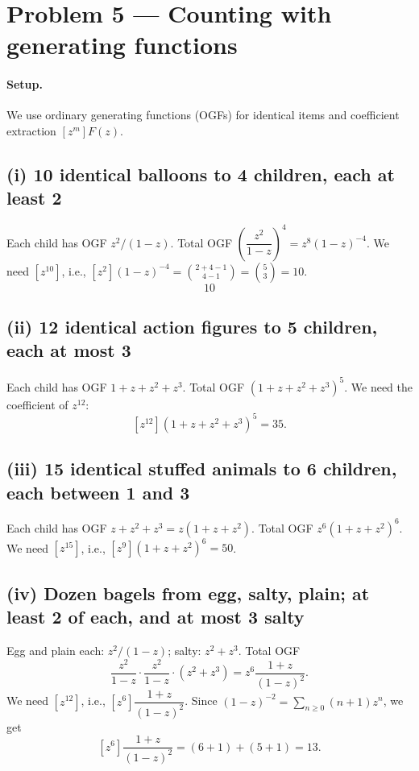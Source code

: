 \section*{Problem 5 — Counting with generating functions}

\paragraph{Setup.}
We use ordinary generating functions (OGFs) for identical items and coefficient extraction $[z^m]F(z)$.

\subsection*{(i) 10 identical balloons to 4 children, each at least 2}
Each child has OGF $z^2/(1-z)$. Total OGF $\left(\dfrac{z^2}{1-z}\right)^4=z^8(1-z)^{-4}$.
We need $[z^{10}]$, i.e., $[z^{2}](1-z)^{-4}=\binom{2+4-1}{4-1}=\binom{5}{3}=10$.
\[
\boxed{10}
\]

\subsection*{(ii) 12 identical action figures to 5 children, each at most 3}
Each child has OGF $1+z+z^2+z^3$. Total OGF $(1+z+z^2+z^3)^5$.
We need the coefficient of $z^{12}$:
\[
[z^{12}](1+z+z^2+z^3)^5=\boxed{35}.
\]

\subsection*{(iii) 15 identical stuffed animals to 6 children, each between 1 and 3}
Each child has OGF $z+z^2+z^3=z(1+z+z^2)$. Total OGF $z^6(1+z+z^2)^6$.
We need $[z^{15}]$, i.e., $[z^{9}](1+z+z^2)^6=\boxed{50}$.

\subsection*{(iv) Dozen bagels from egg, salty, plain; at least 2 of each, and at most 3 salty}
Egg and plain each: $z^2/(1-z)$; salty: $z^2+z^3$. Total OGF
\[
\frac{z^2}{1-z}\cdot\frac{z^2}{1-z}\cdot(z^2+z^3)=z^6\frac{1+z}{(1-z)^2}.
\]
We need $[z^{12}]$, i.e., $[z^{6}]\dfrac{1+z}{(1-z)^2}$.
Since $(1-z)^{-2}=\sum_{n\ge 0} (n+1)z^n$, we get
\[
[z^{6}]\frac{1+z}{(1-z)^2}=(6+1)+(5+1)=\boxed{13}.
\]
